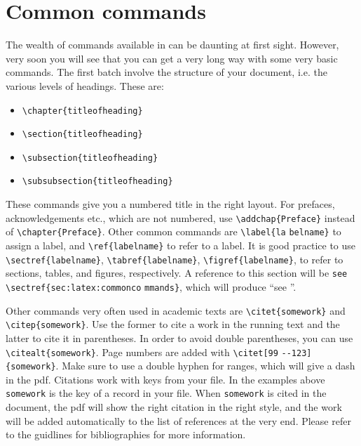 \section{Common commands}\label{sec:latex:commoncommands}
The wealth of commands available in \latex can be daunting at first sight. However, very soon you will see that you can get a very long way with some very basic commands. The first batch involve the structure of your document, i.e. the various levels of headings. These are:
\begin{itemize}
\item \verb+\chapter{titleofheading}+
\item \verb+\section{titleofheading}+
\item \verb+\subsection{titleofheading}+
\item \verb+\subsubsection{titleofheading}+
\end{itemize}

These commands give you a numbered title in the right layout. For prefaces, acknowledgements etc., which are not numbered, use \verb+\addchap{Preface}+ instead of \verb+\chapter{Preface}+. 
Other common commands are 
\verb+\label{la+ \verb+belname}+ 
to assign a label, and 
\verb+\ref{labelname}+
to refer to a label. It is good practice to use 
\verb+\sectref{labelname}+,
\verb+\tabref{labelname}+,
\verb+\figref{labelname}+,
to refer to sections, tables, and figures, respectively. A reference to this section will be \verb+see \sectref{sec:latex:commonco+ \verb+mmands}+, which will produce ``see ''.

Other commands very often used in academic texts are \verb+\citet{somework}+ and \verb+\citep{somework}+. Use the former to cite a work in the running text and the latter to cite it in parentheses. In order to avoid double parentheses, you can use  \verb+\citealt{somework}+. Page numbers are added with \verb+\citet[99+ \verb+--123]{somework}+. Make sure to use a double hyphen for ranges, which will give a dash in the pdf. Citations work with keys from your \bibtex file. In the examples above \verb+somework+ is the key of a record in your \bibtex file. When \verb+somework+ is cited in the document, the pdf will show the right citation in the right style, and the work will be added automatically to the list of references at the very end. Please refer to the guidlines for bibliographies for more information.



